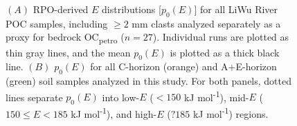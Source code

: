 \begin{figure}[p]
	\label{Ch6Fig:S2} 
\end{figure}

\begin{figure}[p]
	\caption[RPO $p_{0}(E)$ for all samples analyzed]{$(A)$ RPO-derived $E$ distributions [$p_{0}(E)$] for all LiWu River POC samples, including $\geq 2$ mm clasts analyzed separately as a proxy for bedrock OC\textsubscript{petro} ($n = 27$). Individual runs are plotted as thin gray lines, and the mean $p_{0}(E)$ is plotted as a thick black line. $(B)$ $p_{0}(E)$ for all C-horizon (orange) and A+E-horizon (green) soil samples analyzed in this study. For both panels, dotted lines separate $p_{0}(E)$ into low-$E$ ($< 150$ kJ mol\textsuperscript{-1}), mid-$E$ ($150 \leq E < 185$ kJ mol\textsuperscript{-1}), and high-$E$ ($? 185$ kJ mol\textsuperscript{-1}) regions.}
	\label{Ch6Fig:S3} 
\end{figure}

\renewcommand\thefigure{\thechapter.\arabic{figure}}
